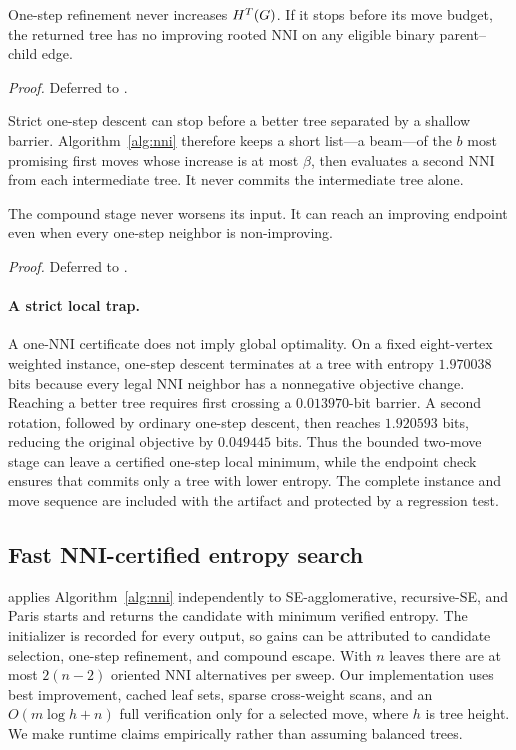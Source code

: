 \begin{proposition}\label{prop:local}
One-step refinement never increases $H^{T}(G)$. If it stops before its move
budget, the returned tree has no improving rooted NNI on any eligible binary
parent--child edge.
\end{proposition}
\emph{Proof.} Deferred to \proofdetails.

Strict one-step descent can stop before a better tree separated by a shallow
barrier. Algorithm~\ref{alg:nni} therefore keeps a short list---a beam---of the
$b$ most promising first moves whose increase is at most $\beta$, then evaluates
a second NNI from each intermediate tree. It never commits the intermediate
tree alone.

\begin{proposition}\label{prop:compound}
The compound stage never worsens its input. It can reach an improving endpoint
even when every one-step neighbor is non-improving.
\end{proposition}
\emph{Proof.} Deferred to \proofdetails.

\paragraph{A strict local trap.}
A one-NNI certificate does not imply global optimality. On a fixed
eight-vertex weighted instance, one-step descent terminates at a tree with
entropy $1.970038$ bits because every legal NNI neighbor has a nonnegative
objective change. Reaching a better tree requires first crossing a
$0.013970$-bit barrier. A second rotation, followed by ordinary one-step
descent, then reaches $1.920593$ bits, reducing the original objective by
$0.049445$ bits. Thus the bounded two-move stage can leave a certified
one-step local minimum, while the endpoint check ensures that \NEST commits
only a tree with lower entropy. The complete instance and move sequence are
included with the artifact and protected by a regression test.

\subsection{Fast NNI-certified entropy search}
\NEST applies Algorithm~\ref{alg:nni} independently to SE-agglomerative,
recursive-SE, and Paris starts and returns the candidate with minimum verified
entropy. The initializer is recorded for every output,
so gains can be attributed to candidate selection, one-step refinement, and
compound escape. With $n$ leaves there are at most $2(n-2)$ oriented NNI
alternatives per sweep. Our implementation uses best improvement, cached leaf sets, sparse
cross-weight scans, and an $O(m\log h+n)$ full verification only for a selected
move, where $h$ is tree height. We make runtime claims empirically rather than
assuming balanced trees.

